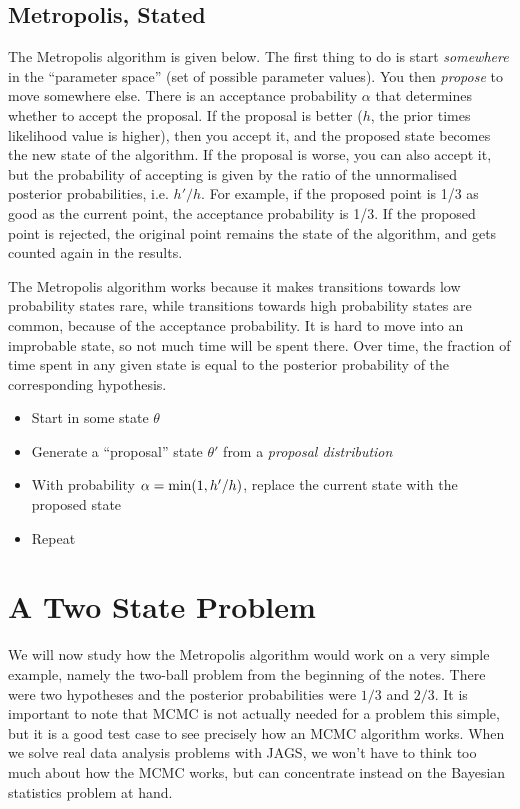 \subsection{Metropolis, Stated}
The Metropolis algorithm is given below. The first thing to do is start
{\it somewhere} in the ``parameter space'' (set of possible parameter values).
You then
{\it propose} to move somewhere else. There is an acceptance probability $\alpha$
that determines whether to accept the proposal. If the proposal is better
($h$, the prior times likelihood value is higher), then you accept it, and the
proposed state becomes the new state of the algorithm.
If the
proposal is worse, you can also accept it, but the probability of accepting is
given by the ratio of the unnormalised posterior probabilities, i.e. $h'/h$.
For example, if the proposed point is 1/3 as good as the current point, the
acceptance probability is 1/3. If the proposed point is rejected, the original
point remains the state of the algorithm, and gets counted again in the results.

The Metropolis algorithm works because it makes transitions towards low
probability
states rare, while transitions towards high probability states are common, because
of the acceptance probability. It is hard to move into an improbable state, so
not much time will be spent there. Over time, the fraction of time spent in
any given state is equal to the posterior probability of the corresponding
hypothesis.

\begin{framed}
\begin{itemize}
\item Start in some state $\theta$
\item Generate a ``proposal'' state $\theta'$ from a {\it proposal distribution}
\item With probability $\alpha = \textnormal{min}(1, h'/h)$, replace the current
state with the proposed state
\item Repeat
\end{itemize}
\end{framed}

\section{A Two State Problem}
We will now study how the Metropolis algorithm would work on a very simple
example, namely the two-ball problem from the beginning of the notes. There
were two hypotheses and the posterior probabilities were $1/3$ and $2/3$.
It is important to note that MCMC is not actually needed for a problem this
simple, but it is a good test case to see precisely how an MCMC algorithm works.
When we solve real data analysis problems with JAGS,
we won't have to think too
much about how the MCMC works, but can concentrate instead on the Bayesian
statistics problem at hand.


